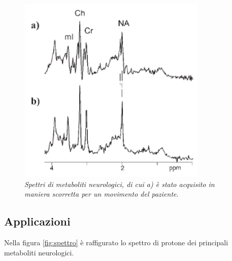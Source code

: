 \documentclass{report}
\newcommand{\figref}[1]{figura \ref{#1}}
\numberwithin{equation}{section}
\numberwithin{figure}{section}
\begin{document}
\begin{figure}[htp]
\centering
\includegraphics[scale=1]{immagini/mov.png}
\caption{\label{fig:mov} \textit{Spettri di metaboliti neurologici, di cui a) è stato acquisito in maniera scorretta per un movimento del paziente}.}
\end{figure}

\subsection{Applicazioni}
Nella \figref{fig:spettro} è raffigurato lo spettro di protone dei principali metaboliti neurologici.
\end{document}
